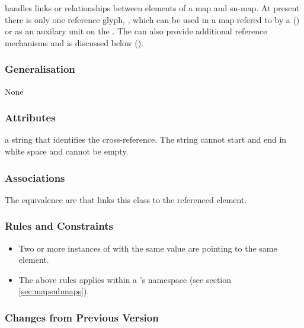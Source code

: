  handles links or relationships between elements of a
map and su-map. At present there is only one reference glyph,
, which can be used in a map refered to by a 
() or as an auxilary unit on the . The
 can also provide additional reference mechanisms
and is discussed below ().

\subsubsection{Generalisation}

None

\subsubsection{Attributes}

\begin{attributes}
   a string that identifies the
  cross-reference. The string cannot start and end in white space and
  cannot be empty.
\end{attributes}

\subsubsection{Associations}

\begin{attributes}
   The
  equivalence arc that links this class to the referenced element.
\end{attributes}

\subsubsection{Rules and Constraints}

\begin{itemize}
\item  Two or more instances of  with the
  same  value are pointing to the same element.
\item The above rules applies within a \PDm's namespace (see section \ref{sec:mapsubmaps}).
\end{itemize}

\subsubsection{Changes from Previous Version}

